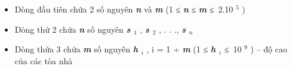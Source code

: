 \begin{itemize}
	\item Dòng đầu tiên chứa 2 số nguyên \textbf{\emph{ n }} và \textbf{\emph{ m }} (1 ≤ \textbf{\emph{ n }} ≤ \textbf{\emph{ m }} ≤ 2.10 $^ 5 $ )
	\item Dòng thứ 2 chứa \textbf{\emph{ n }} số nguyên \textbf{\emph{ s $_ 1 $}} , \textbf{\emph{ s $_ 2 $}} , . . ., \textbf{\emph{ s $_ n $}}
	\item Dòng thứa 3 chứa \textbf{\emph{ m }} số nguyên \textbf{\emph{ h $_ i $}} , i = 1 ÷ \textbf{\emph{ m }} (1 ≤ \textbf{\emph{ h $_ i $}} ≤ 10 $^ 9 $ ) – độ cao của các tòa nhà
\end{itemize}

\